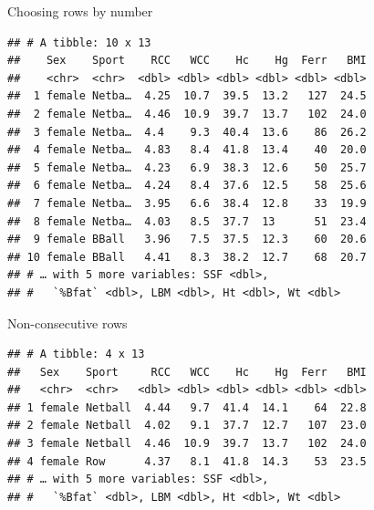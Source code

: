 \documentclass[ignorenonframetext,]{beamer}
\newenvironment{Shaded}{\begin{snugshade}}{\end{snugshade}}
\newcommand{\DecValTok}[1]{\textcolor[rgb]{0.00,0.00,0.81}{#1}}
\newcommand{\KeywordTok}[1]{\textcolor[rgb]{0.13,0.29,0.53}{\textbf{#1}}}
\newcommand{\NormalTok}[1]{#1}
\newcommand{\OperatorTok}[1]{\textcolor[rgb]{0.81,0.36,0.00}{\textbf{#1}}}
\newcommand{\StringTok}[1]{\textcolor[rgb]{0.31,0.60,0.02}{#1}}
\begin{document}
\begin{frame}[fragile]{Choosing rows by number}
\protect\hypertarget{choosing-rows-by-number}{}

\begin{Shaded}
\end{Shaded}

\begin{verbatim}
## # A tibble: 10 x 13
##    Sex    Sport    RCC   WCC    Hc    Hg  Ferr   BMI
##    <chr>  <chr>  <dbl> <dbl> <dbl> <dbl> <dbl> <dbl>
##  1 female Netba…  4.25  10.7  39.5  13.2   127  24.5
##  2 female Netba…  4.46  10.9  39.7  13.7   102  24.0
##  3 female Netba…  4.4    9.3  40.4  13.6    86  26.2
##  4 female Netba…  4.83   8.4  41.8  13.4    40  20.0
##  5 female Netba…  4.23   6.9  38.3  12.6    50  25.7
##  6 female Netba…  4.24   8.4  37.6  12.5    58  25.6
##  7 female Netba…  3.95   6.6  38.4  12.8    33  19.9
##  8 female Netba…  4.03   8.5  37.7  13      51  23.4
##  9 female BBall   3.96   7.5  37.5  12.3    60  20.6
## 10 female BBall   4.41   8.3  38.2  12.7    68  20.7
## # … with 5 more variables: SSF <dbl>,
## #   `%Bfat` <dbl>, LBM <dbl>, Ht <dbl>, Wt <dbl>
\end{verbatim}

\end{frame}

\begin{frame}[fragile]{Non-consecutive rows}
\protect\hypertarget{non-consecutive-rows}{}

\begin{Shaded}
\end{Shaded}

\begin{verbatim}
## # A tibble: 4 x 13
##   Sex    Sport     RCC   WCC    Hc    Hg  Ferr   BMI
##   <chr>  <chr>   <dbl> <dbl> <dbl> <dbl> <dbl> <dbl>
## 1 female Netball  4.44   9.7  41.4  14.1    64  22.8
## 2 female Netball  4.02   9.1  37.7  12.7   107  23.0
## 3 female Netball  4.46  10.9  39.7  13.7   102  24.0
## 4 female Row      4.37   8.1  41.8  14.3    53  23.5
## # … with 5 more variables: SSF <dbl>,
## #   `%Bfat` <dbl>, LBM <dbl>, Ht <dbl>, Wt <dbl>
\end{verbatim}

\end{frame}
\end{document}
